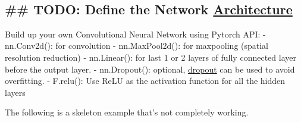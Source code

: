 \documentclass[11pt]{article}
\begin{document}
    \begin{center}
    \end{center}
    { \hspace*{\fill} \\}
    
    \subsection{\texorpdfstring{\#\# \textbf{TODO}: Define the Network
\href{http://pytorch.org/docs/stable/nn.html}{Architecture}}{\#\# TODO: Define the Network Architecture}}\label{todo-define-the-network-architecture}

Build up your own Convolutional Neural Network using Pytorch API: -
nn.Conv2d(): for convolution - nn.MaxPool2d(): for maxpooling (spatial
resolution reduction) - nn.Linear(): for last 1 or 2 layers of fully
connected layer before the output layer. - nn.Dropout(): optional,
\href{https://pytorch.org/docs/stable/generated/torch.nn.Dropout.html}{dropout}
can be used to avoid overfitting. - F.relu(): Use ReLU as the activation
function for all the hidden layers

The following is a skeleton example that's not completely working.
\end{document}
